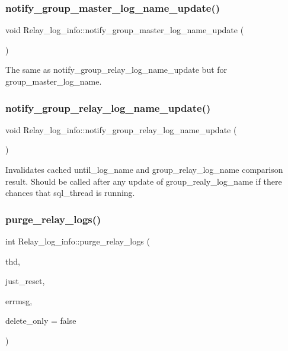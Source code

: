 \subsubsection{\texorpdfstring{notify\+\_\+group\+\_\+master\+\_\+log\+\_\+name\+\_\+update()}{notify\_group\_master\_log\_name\_update()}}
{\footnotesize\ttfamily void Relay\+\_\+log\+\_\+info\+::notify\+\_\+group\+\_\+master\+\_\+log\+\_\+name\+\_\+update (\begin{DoxyParamCaption}{ }\end{DoxyParamCaption})\hspace{0.3cm}{\ttfamily [inline]}}

The same as {\ttfamily notify\+\_\+group\+\_\+relay\+\_\+log\+\_\+name\+\_\+update} but for {\ttfamily group\+\_\+master\+\_\+log\+\_\+name}. \mbox{\label{classRelay__log__info_ac73b919ab5c4fc95d32307c757ad39f3}} 
\subsubsection{\texorpdfstring{notify\+\_\+group\+\_\+relay\+\_\+log\+\_\+name\+\_\+update()}{notify\_group\_relay\_log\_name\_update()}}
{\footnotesize\ttfamily void Relay\+\_\+log\+\_\+info\+::notify\+\_\+group\+\_\+relay\+\_\+log\+\_\+name\+\_\+update (\begin{DoxyParamCaption}{ }\end{DoxyParamCaption})\hspace{0.3cm}{\ttfamily [inline]}}

Invalidates cached until\+\_\+log\+\_\+name and group\+\_\+relay\+\_\+log\+\_\+name comparison result. Should be called after any update of group\+\_\+realy\+\_\+log\+\_\+name if there chances that sql\+\_\+thread is running. \mbox{\label{classRelay__log__info_aefa8a03a7e52ba50a0d4b229c01c2369}} 
\subsubsection{\texorpdfstring{purge\+\_\+relay\+\_\+logs()}{purge\_relay\_logs()}}
{\footnotesize\ttfamily int Relay\+\_\+log\+\_\+info\+::purge\+\_\+relay\+\_\+logs (\begin{DoxyParamCaption}\item[{T\+HD $\ast$}]{thd,  }\item[{bool}]{just\+\_\+reset,  }\item[{const char $\ast$$\ast$}]{errmsg,  }\item[{bool}]{delete\+\_\+only = {\ttfamily false} }\end{DoxyParamCaption})}

